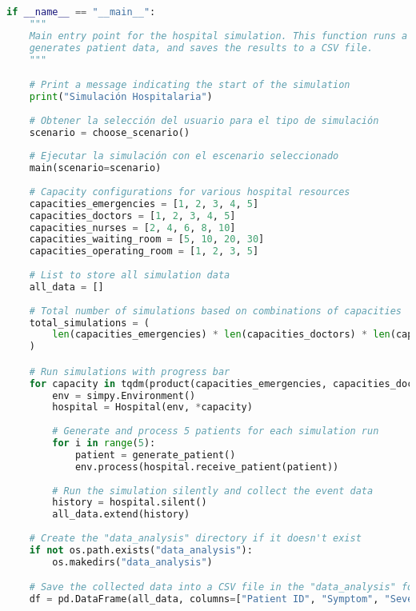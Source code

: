 \documentclass[a4paper,12pt]{article}
\begin{document}
\begin{lstlisting}[language=Python]
if __name__ == "__main__":
    """
    Main entry point for the hospital simulation. This function runs a series of simulations with varying hospital capacities,
    generates patient data, and saves the results to a CSV file.
    """

    # Print a message indicating the start of the simulation
    print("Simulación Hospitalaria")
    
    # Obtener la selección del usuario para el tipo de simulación
    scenario = choose_scenario()
    
    # Ejecutar la simulación con el escenario seleccionado
    main(scenario=scenario)
    
    # Capacity configurations for various hospital resources
    capacities_emergencies = [1, 2, 3, 4, 5]
    capacities_doctors = [1, 2, 3, 4, 5]
    capacities_nurses = [2, 4, 6, 8, 10]
    capacities_waiting_room = [5, 10, 20, 30]
    capacities_operating_room = [1, 2, 3, 5]
    
    # List to store all simulation data
    all_data = []
    
    # Total number of simulations based on combinations of capacities
    total_simulations = (
        len(capacities_emergencies) * len(capacities_doctors) * len(capacities_nurses) * len(capacities_waiting_room) * len(capacities_operating_room)
    )

    # Run simulations with progress bar
    for capacity in tqdm(product(capacities_emergencies, capacities_doctors, capacities_nurses, capacities_waiting_room, capacities_operating_room), total=total_simulations):
        env = simpy.Environment()
        hospital = Hospital(env, *capacity)
        
        # Generate and process 5 patients for each simulation run
        for i in range(5):
            patient = generate_patient()
            env.process(hospital.receive_patient(patient))
        
        # Run the simulation silently and collect the event data
        history = hospital.silent()
        all_data.extend(history)
    
    # Create the "data_analysis" directory if it doesn't exist
    if not os.path.exists("data_analysis"):
        os.makedirs("data_analysis")

    # Save the collected data into a CSV file in the "data_analysis" folder
    df = pd.DataFrame(all_data, columns=["Patient ID", "Symptom", "Severity", "Arrival Time", "Departure Time"])
    

\end{lstlisting}
\end{document}
